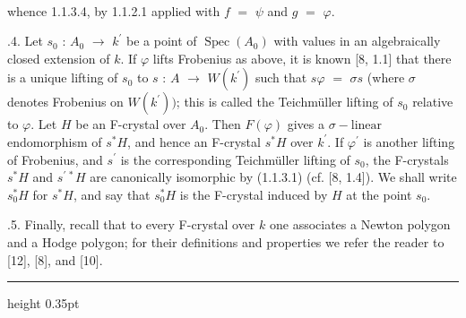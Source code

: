 \documentclass[9pt]{article}
\newcommand{\CanonText}[1]{\par{\fontsize{8.0}{9.35}\selectfont\RaggedRight #1\par}\vspace{2.2pt}}
\newenvironment{CanonMathBlock}{\par\vspace{1.2pt}\begin{center}\fontsize{6.8}{8.0}\selectfont\(\displaystyle}{\)\end{center}\vspace{1.2pt}}
\begin{document}
\begin{minipage}[t][\dimexpr\textheight-5pt\relax][t]{\textwidth}
\begin{CanonMathBlock}
\begin{aligned}
\end{aligned}
\end{CanonMathBlock}
\CanonText{whence 1.1.3.4, by 1.1.2.1 applied with \(f\) \(=\) \(\psi{}\) and \(g\) \(=\) \(\varphi{}\).}
\CanonText{1.1.4. Let \(s_{0}\) : \(A_{0}\) \(\to{}\) \(k^{\prime}\) be a point of \(\operatorname{Spec}(A_{0})\) with values in an algebraically closed extension of \(k\). If \(\varphi{}\) lifts Frobenius as above, it is known [8, 1.1] that there is a unique lifting of \(s_{0}\) to \(s\) : \(A\) \(\to{}\) \(W(k^{\prime})\) such that \(s\varphi{}\) \(=\) \(\sigma{}s\) (where \(\sigma{}\) denotes Frobenius on \(W(k^{\prime}))\); this is called the Teichmüller lifting of \(s_{0}\) relative to \(\varphi{}\). Let \(H\) be an F-crystal over \(A_{0}\). Then \(F(\varphi{})\) gives a \(\sigma{}-\text{linear}\) endomorphism of \(s^{*}H\), and hence an F-crystal \(s^{*}H\) over \(k^{\prime}\). If \(\varphi{}^{\prime}\) is another lifting of Frobenius, and \(s^{\prime}\) is the corresponding Teichmüller lifting of \(s_{0}\), the F-crystals \(s^{*}H\) and \(s^{\prime\,*}H\) are canonically isomorphic by (1.1.3.1) (cf. [8, 1.4]). We shall write \(s_{0}^{*}H\) for \(s^{*}H\), and say that \(s_{0}^{*}H\) is the F-crystal induced by \(H\) at the point \(s_{0}\).}
\CanonText{1.1.5. Finally, recall that to every F-crystal over \(k\) one associates a Newton polygon and a Hodge polygon; for their definitions and properties we refer the reader to [12], [8], and [10].}
\vfill
{\color{Accent}\hrule height 0.35pt}\vspace{3pt}
\end{minipage}
\newpage
\end{document}

